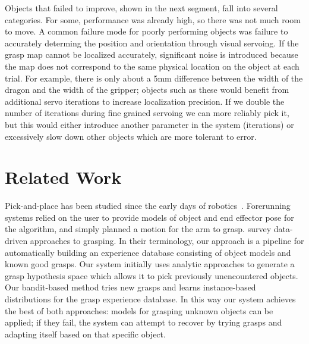 \documentclass{article}
\begin{document}

Objects that failed to improve, shown in the next segment, fall into
several categories.  For some, performance was already high, so there
was not much room to move.  A common failure mode for poorly
performing objects was failure to accurately determing the position
and orientation through visual servoing.  If the grasp map cannot be
localized accurately, significant noise is introduced because the map
does not correspond to the same physical location on the object at
each trial.  For example, there is only about a 5mm difference
between the width of the dragon and the width of the gripper; objects
such as these would benefit from additional servo iterations to
increase localization precision. If we double the number of iterations
during fine grained servoing we can more reliably pick it, but this
would either introduce another parameter in the system (iterations) or
excessively slow down other objects which are more tolerant to error.






\section{Related Work}

\label{sec:relatedwork}


Pick-and-place has been studied since the early days of
robotics~\citep{brooks83, lozano89}.  Forerunning systems relied on
the user to provide models of object and end effector pose for the
algorithm, and simply planned a motion for the arm to grasp.
\citet{bohg13} survey data-driven approaches to grasping.  In their
terminology, our approach is a pipeline for automatically building an
experience database consisting of object models and known good grasps.
Our system initially uses analytic approaches to generate a grasp
hypothesis space which allows it to pick previously unencountered
objects. Our bandit-based method tries new grasps and learns
instance-based distributions for the grasp experience database.  In
this way our system achieves the best of both approaches: models for
grasping unknown objects can be applied; if they fail, the system can
attempt to recover by trying grasps and adapting itself based on that
specific object.
\end{document}
